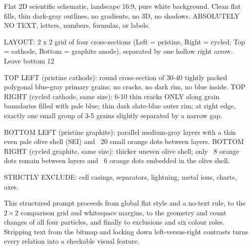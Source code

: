 \begin{Prompt}
Flat 2D scientific schematic, landscape 16:9, pure white background. Clean
flat fills, thin dark-gray outlines, no gradients, no 3D, no shadows.
ABSOLUTELY NO TEXT, letters, numbers, formulas, or labels.

LAYOUT: 2 x 2 grid of four cross-sections (Left = pristine, Right = cycled;
Top = cathode, Bottom = graphite anode), separated by one hollow right arrow.
Leave bottom 12%

TOP LEFT (pristine cathode): round cross-section of 30-40 tightly packed
polygonal blue-gray primary grains; no cracks, no dark rim, no blue inside.
TOP RIGHT (cycled cathode, same size): 6-10 thin cracks ONLY along grain
boundaries filled with pale blue; thin dark slate-blue outer rim; at right
edge, exactly one small group of 3-5 grains slightly separated by a narrow gap.

BOTTOM LEFT (pristine graphite): parallel medium-gray layers with a thin even
pale olive shell (SEI) and ~20 small orange dots between layers.
BOTTOM RIGHT (cycled graphite, same size): thicker uneven olive shell; only ~8
orange dots remain between layers and ~6 orange dots embedded in the olive shell.

STRICTLY EXCLUDE: cell casings, separators, lightning, metal ions, charts, axes.
\end{Prompt}

This structured prompt proceeds from global flat style and a no-text rule, to the $2\times 2$ comparison grid and whitespace margins, to the geometry and count changes of all four particles, and finally to exclusions and six colour roles. Stripping text from the bitmap and locking down left-versus-right contrasts turns every relation into a checkable visual feature.

